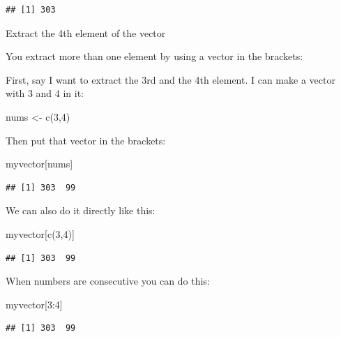 \documentclass[
]{book}
\newenvironment{Shaded}{\begin{snugshade}}{\end{snugshade}}
\newcommand{\DecValTok}[1]{\textcolor[rgb]{0.00,0.00,0.81}{#1}}
\newcommand{\FunctionTok}[1]{\textcolor[rgb]{0.00,0.00,0.00}{#1}}
\newcommand{\NormalTok}[1]{#1}
\newcommand{\OtherTok}[1]{\textcolor[rgb]{0.56,0.35,0.01}{#1}}
\newcommand{\SpecialCharTok}[1]{\textcolor[rgb]{0.00,0.00,0.00}{#1}}
\begin{document}
\begin{verbatim}
## [1] 303
\end{verbatim}

Extract the 4th element of the vector

You extract more than one element by using a vector in the brackets:

First, say I want to extract the 3rd and the 4th element. I can make a vector with 3 and 4 in it:

\begin{Shaded}
\begin{Highlighting}[]
\NormalTok{nums }\OtherTok{\textless{}{-}} \FunctionTok{c}\NormalTok{(}\DecValTok{3}\NormalTok{,}\DecValTok{4}\NormalTok{)}
\end{Highlighting}
\end{Shaded}

Then put that vector in the brackets:

\begin{Shaded}
\begin{Highlighting}[]
\NormalTok{myvector[nums]}
\end{Highlighting}
\end{Shaded}

\begin{verbatim}
## [1] 303  99
\end{verbatim}

We can also do it directly like this:

\begin{Shaded}
\begin{Highlighting}[]
\NormalTok{myvector[}\FunctionTok{c}\NormalTok{(}\DecValTok{3}\NormalTok{,}\DecValTok{4}\NormalTok{)]}
\end{Highlighting}
\end{Shaded}

\begin{verbatim}
## [1] 303  99
\end{verbatim}

When numbers are consecutive you can do this:

\begin{Shaded}
\begin{Highlighting}[]
\NormalTok{myvector[}\DecValTok{3}\SpecialCharTok{:}\DecValTok{4}\NormalTok{]}
\end{Highlighting}
\end{Shaded}

\begin{verbatim}
## [1] 303  99
\end{verbatim}
\end{document}
